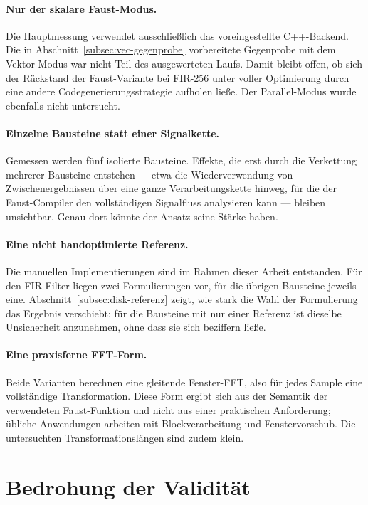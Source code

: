 \paragraph{Nur der skalare Faust-Modus.}
Die Hauptmessung verwendet ausschließlich das voreingestellte C++-Backend. Die in Abschnitt~\ref{subsec:vec-gegenprobe} vorbereitete Gegenprobe mit dem Vektor-Modus war nicht Teil des ausgewerteten Laufs. Damit bleibt offen, ob sich der Rückstand der Faust-Variante bei FIR-256 unter voller Optimierung durch eine andere Codegenerierungsstrategie aufholen ließe. Der Parallel-Modus wurde ebenfalls nicht untersucht.

\paragraph{Einzelne Bausteine statt einer Signalkette.}
Gemessen werden fünf isolierte Bausteine. Effekte, die erst durch die Verkettung mehrerer Bausteine entstehen --- etwa die Wiederverwendung von Zwischenergebnissen über eine ganze Verarbeitungskette hinweg, für die der Faust-Compiler den vollständigen Signalfluss analysieren kann --- bleiben unsichtbar. Genau dort könnte der Ansatz seine Stärke haben.

\paragraph{Eine nicht handoptimierte Referenz.}
Die manuellen Implementierungen sind im Rahmen dieser Arbeit entstanden. Für den FIR-Filter liegen zwei Formulierungen vor, für die übrigen Bausteine jeweils eine. Abschnitt~\ref{subsec:disk-referenz} zeigt, wie stark die Wahl der Formulierung das Ergebnis verschiebt; für die Bausteine mit nur einer Referenz ist dieselbe Unsicherheit anzunehmen, ohne dass sie sich beziffern ließe.

\paragraph{Eine praxisferne FFT-Form.}
Beide Varianten berechnen eine gleitende Fenster-FFT, also für jedes Sample eine vollständige Transformation. Diese Form ergibt sich aus der Semantik der verwendeten Faust-Funktion und nicht aus einer praktischen Anforderung; übliche Anwendungen arbeiten mit Blockverarbeitung und Fenstervorschub. Die untersuchten Transformationslängen sind zudem klein.

\section{Bedrohung der Validität}
\label{sec:validitaet}


